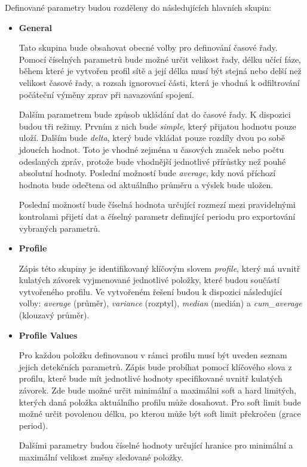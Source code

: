  
 Definované parametry budou rozděleny do následujících hlavních skupin:
 \begin{itemize}
  \item \textbf{General} 
  
  Tato skupina bude obsahovat obecné volby pro definování časové řady. Pomocí číselných parametrů 
  bude možné určit velikost řady, délku učící fáze, během které je vytvořen profil sítě a její délka
  musí být stejná nebo delší než velikost časové řady, a rozsah ignorovací části, která je vhodná
  k odfiltrování počáteční výměny zprav při navazování spojení. 
  
  Dalším parametrem bude způsob 
  ukládání dat do časové řady. K dispozici budou tři režimy. Prvním z nich bude \textit{simple},
  který přijatou
  hodnotu pouze uloží. Dalším bude \textit{delta}, který bude vkládat pouze rozdíly dvou po
  sobě jdoucích hodnot. 
  Toto je vhodné zejména u časových značek nebo počtu odeslaných zpráv, protože bude vhodnější 
  jednotlivé přírůstky než pouhé absolutní hodnoty. Poslední možností bude \textit{average}, kdy 
  nová příchozí hodnota bude odečtena od aktuálního průměru a výslek bude uložen.
  
  Poslední možností bude číselná hodnota určující rozmezí mezi pravidelnými kontrolami
  přijetí dat a 
  číselný parametr definující periodu pro exportování vybraných parametrů.
  
  \item \textbf{Profile}
  
  Zápis této skupiny je identifikovaný klíčovým slovem \textit{profile}, který má uvnitř kulatých závorek 
  vyjmenované jednotlivé položky, které budou součástí vytvořeného profilu. Ve vytvořeném řešení 
  budou k dispozici následující volby: \textit{average} (průměr), \textit{variance} (rozptyl), 
  \textit{median} (medián) a \textit{cum\_average} (klouzavý průměr).
  
  \item \textbf{Profile Values}
  
  Pro každou položku definovanou v rámci profilu musí být uveden seznam jejich detekčních parametrů.
  Zápis bude probíhat pomocí klíčového slova z profilu, které bude mít jednotlivé hodnoty 
  specifikované uvnitř kulatých závorek. Zde bude možné určit minimální a maximálni soft a hard
  limitých, kterých daná položka aktuálního profilu může dosahovat. Pro soft limit bude možné 
  určit povolenou délku, po kterou může být soft limit překročen (grace period). 
  
  Dalšími parametry budou číselné hodnoty určující hranice pro minimální a maximální velikost 
  změny sledované položky.
  

\end{itemize}
